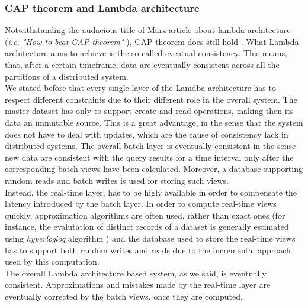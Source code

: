 \subsubsection{CAP theorem and Lambda architecture}
Notwithstanding the audacious title of Marz article about lambda architecture (\textit{i.e. "How to beat CAP theorem"} \cite{bib2}), CAP theorem does still hold \cite{bib5}. What Lambda architecture aims to achieve is the so-called eventual consistency. This means, that, after a certain timeframe, data are eventually consistent across all the partitions of a distributed system. \\
We stated before that every single layer of the Lamdba architecture has to respect different constraints due to their different role in the overall system. The master dataset has only to support create and read operations, making then its data an immutable source. This is a great advantage, in the sense that the system does not have to deal with updates, which are the cause of consistency lack in distributed systems. The overall batch layer is eventually consistent in the sense new data are consistent with the query results for a time interval only after the corresponding batch views have been calculated. Moreover, a database supporting random reads and batch writes is used for storing such views.\\
Instead, the real-time layer, has to be higly available in order to compensate the latency introduced by the batch layer. In order to compute real-time views quickly, approximation algorithms are often used, rather than exact ones (for instance, the evalutation of distinct records of a dataset is generally estimated using  \textit{hyperloglog} algorithm \cite{bib6}) and the database used to store the real-time views has to support both random writes and reads due to the incremental approach used by this computation.\\
The overall Lambda architecture based system, as we said, is eventually consistent. Approximations and mistakes made by the real-time layer are eventually corrected by the batch views, once they are computed. 
